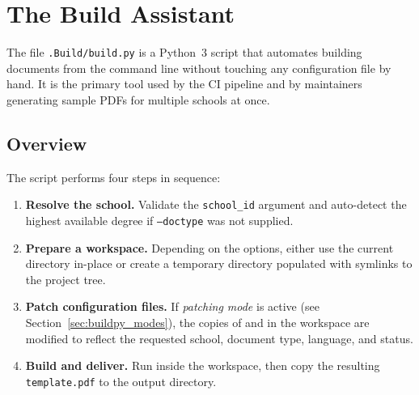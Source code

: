 

%

\chapter{The  Build Assistant}
\label{app:build_py}

The file \verb!.Build/build.py! is a Python~3 script that automates building
\novathesis{} documents from the command line without touching any
configuration file by hand.  It is the primary tool used by the
CI pipeline and by maintainers generating sample PDFs for multiple
schools at once.


\section{Overview}
\label{sec:buildpy_overview}

The script performs four steps in sequence:

\begin{enumerate}
  \item \textbf{Resolve the school.}  Validate the \texttt{school\_id}
        argument and auto-detect the highest available degree if
        \texttt{--doctype} was not supplied.
  \item \textbf{Prepare a workspace.}  Depending on the options, either
        use the current directory in-place or create a temporary directory
        populated with symlinks to the project tree.
  \item \textbf{Patch configuration files.}  If \emph{patching mode} is
        active (see Section~\ref{sec:buildpy_modes}), the copies of
         and 
        in the workspace are modified to reflect the requested school,
        document type, language, and status.
  \item \textbf{Build and deliver.}  Run  inside the workspace,
        then copy the resulting \verb!template.pdf! to the output directory.
  \end{enumerate}

